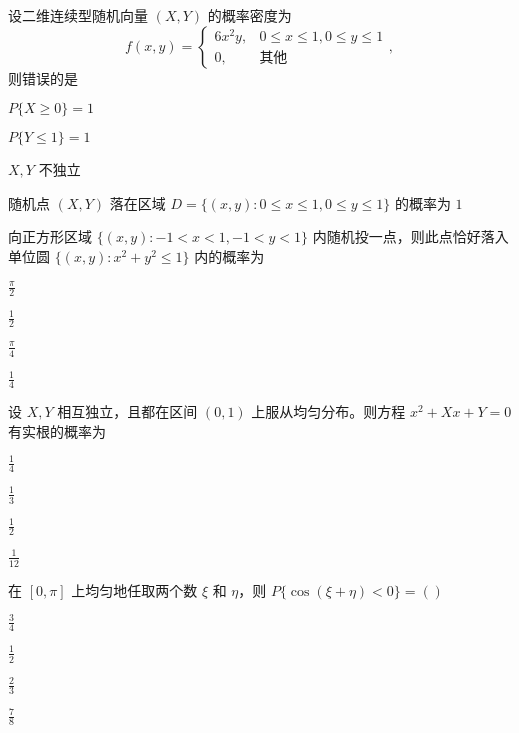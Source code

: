 \documentclass{exam-zh}
\begin{document}
\begin{question}
  设二维连续型随机向量 $(X, Y)$ 的概率密度为
  $$f(x, y) = 
  \begin{cases} 
  6x^2y, & 0 \leq x \leq 1, 0 \leq y \leq 1 \\ 
  0, & \text{其他} 
  \end{cases},$$ 
  则错误的是 \paren[C]
  \begin{choices}
    \item $P\{X \geq 0\} = 1$  
    \item $P\{Y \leq 1\} = 1$  
    \item $X, Y$ 不独立  
    \item 随机点 $(X, Y)$ 落在区域 $D = \{(x, y) : 0 \leq x \leq 1, 0 \leq y \leq 1\}$ 的概率为 $1$  
  \end{choices}
\end{question}

\begin{question}
  向正方形区域 $\{(x, y): -1 < x < 1, -1 < y < 1\}$ 内随机投一点，则此点恰好落入单位圆 $\{(x, y): x^2 + y^2 \leq 1\}$ 内的概率为 \paren[C]
  \begin{choices}
    \item $\frac{\pi}{2}$  
    \item $\frac{1}{2}$  
    \item $\frac{\pi}{4}$  
    \item $\frac{1}{4}$  
  \end{choices}
\end{question}

\begin{question}
  设 $X, Y$ 相互独立，且都在区间 $(0,1)$ 上服从均匀分布。则方程 $x^2 + Xx + Y = 0$ 有实根的概率为 \paren[D]
  \begin{choices}
    \item $\frac{1}{4}$  
    \item $\frac{1}{3}$  
    \item $\frac{1}{2}$  
    \item $\frac{1}{12}$  
  \end{choices}
\end{question}

\begin{question}
  在 $[0, \pi]$ 上均匀地任取两个数 $\xi$ 和 $\eta$，则  
  $P\{\cos(\xi + \eta) < 0\} = ( )$ \paren[A]
  \begin{choices}
    \item $\frac{3}{4}$  
    \item $\frac{1}{2}$  
    \item $\frac{2}{3}$  
    \item $\frac{7}{8}$  
  \end{choices}
\end{question}
\end{document}
